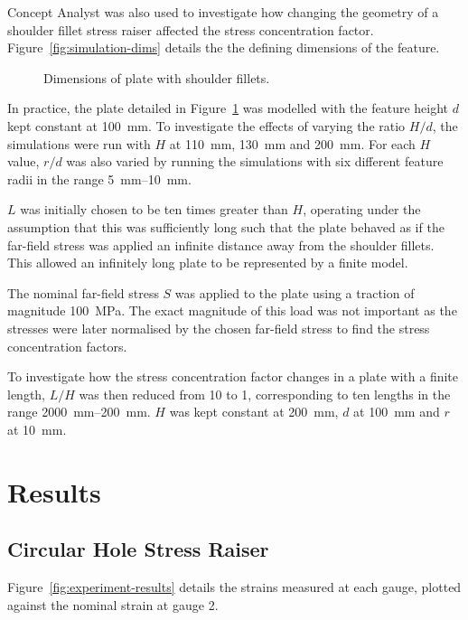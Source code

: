 \documentclass[a4paper,11pt,twocolumn]{article}
\newcommand{\MPa}{\si{\mega\pascal}\xspace}
\newcommand{\mm}{\si{\milli\meter}\xspace}
\begin{document}
Concept Analyst was also used to investigate how changing the geometry of a 
shoulder fillet stress raiser affected the stress concentration factor. 
Figure~\vref{fig:simulation-dims} details the the defining dimensions of the 
feature.

\begin{figure}[h]
    \centering
    \def\svgwidth{\linewidth}
    
    \caption{Dimensions of plate with shoulder fillets.}
    \label{fig:simulation-dims}
\end{figure}

In practice, the plate detailed in Figure~\ref{fig:simulation-dims} was modelled
with the feature height $d$ kept constant at 100~\mm. To investigate the effects
of varying the ratio $H/d$, the simulations were run with $H$ at 110~\mm,
130~\mm and 200~\mm. For each $H$ value, $r/d$ was also varied by running the
simulations with six different feature radii in the range 5~\mm--10~\mm.

$L$ was initially chosen to be ten times greater than $H$, operating under the
assumption that this was sufficiently long such that the plate behaved as if 
the far-field stress was applied an infinite distance away from the shoulder 
fillets. This allowed an infinitely long plate to be represented by a finite
model.

The nominal far-field stress $S$ was applied to the plate using a traction of
magnitude 100~\MPa. The exact magnitude of this load was not important as
the stresses were later normalised by the chosen far-field stress to find the 
stress concentration factors.

To investigate how the stress concentration factor changes in a plate with a
finite length, $L/H$ was then reduced from 10 to 1, corresponding to ten 
lengths in the range 2000~\mm--200~\mm. $H$ was kept constant at 200~\mm, $d$ 
at 100~\mm and $r$ at 10~\mm.

\section{Results}

\subsection{Circular Hole Stress Raiser}

Figure~\vref{fig:experiment-results} details the strains measured at each 
gauge, plotted against the nominal strain at gauge 2.
\end{document}
